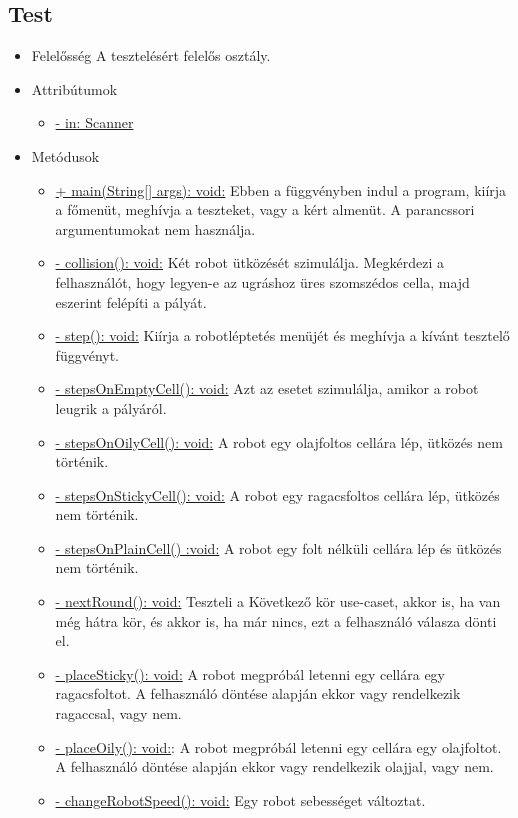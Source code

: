 \subsection{Test}
\begin{itemize}
	\item Felelősség
		A tesztelésért felelős osztály.
	
	\item Attribútumok
	\begin{itemize}
		\item \underline{- in: Scanner}
	\end{itemize}
	\item Metódusok
	\begin{itemize}
		\item \underline{+ main(String[] args): void:} Ebben a függvényben indul a program, kiírja a főmenüt, meghívja a teszteket, vagy a kért almenüt. A parancssori argumentumokat nem használja.
		\item \underline{- collision(): void:} Két robot ütközését szimulálja. Megkérdezi a felhasználót, hogy legyen-e az ugráshoz üres szomszédos cella, majd eszerint felépíti a pályát.
		\item \underline{- step(): void:} Kiírja a robotléptetés menüjét és meghívja a kívánt tesztelő függvényt.
		\item \underline{- stepsOnEmptyCell(): void:} Azt az esetet szimulálja, amikor a robot leugrik a pályáról.
		\item \underline{- stepsOnOilyCell(): void:} A robot egy olajfoltos cellára lép, ütközés nem történik.
		\item \underline{- stepsOnStickyCell(): void:} A robot egy ragacsfoltos cellára lép, ütközés nem történik.
		\item \underline{- stepsOnPlainCell() :void:} A robot egy folt nélküli cellára lép és ütközés nem történik.
		\item\underline{ - nextRound(): void:} Teszteli a Következő kör use-caset, akkor is, ha van még hátra kör, és akkor is, ha már nincs, ezt a felhasználó válasza dönti el.
		\item \underline{- placeSticky(): void:} A robot megpróbál letenni egy cellára egy ragacsfoltot. A felhasználó döntése alapján ekkor vagy rendelkezik ragaccsal, vagy nem.
		\item \underline{- placeOily(): void:}: A robot megpróbál letenni egy cellára egy olajfoltot. A felhasználó döntése alapján ekkor vagy rendelkezik olajjal, vagy nem.
		\item \underline{- changeRobotSpeed(): void:} Egy robot sebességet változtat.

\end{itemize}
\end{itemize}
